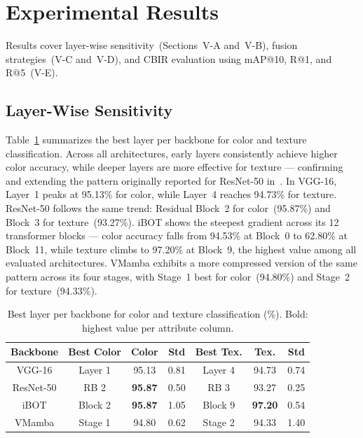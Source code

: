 \documentclass[conference]{IEEEtran}
\begin{document}
\section{Experimental Results}

Results cover layer-wise sensitivity~(Sections~V-A and~V-B), fusion
strategies~(V-C and~V-D), and CBIR evaluation using mAP@10, R@1, and
R@5~(V-E).

\subsection{Layer-Wise Sensitivity}

Table~\ref{tab_best_layer} summarizes the best layer per backbone for
color and texture classification.
Across all architectures, early layers consistently achieve higher color
accuracy, while deeper layers are more effective for texture — confirming
and extending the pattern originally reported for ResNet-50
in~\cite{b2}.
In VGG-16, Layer~1 peaks at 95.13\% for color, while Layer~4 reaches
94.73\% for texture.
ResNet-50 follows the same trend: Residual Block~2 for color~(95.87\%)
and Block~3 for texture~(93.27\%).
iBOT shows the steepest gradient across its 12 transformer blocks —
color accuracy falls from 94.53\% at Block~0 to 62.80\% at Block~11,
while texture climbs to 97.20\% at Block~9, the highest value among all
evaluated architectures.
VMamba exhibits a more compressed version of the same pattern across its
four stages, with Stage~1 best for color~(94.80\%) and Stage~2 for
texture~(94.33\%).

\begin{table}[htbp]
\caption{Best layer per backbone for color and texture classification
         (\%). Bold: highest value per attribute column.}
\begin{center}
\begin{tabular}{c|c|c|c|c|c|c}
\hline
\textbf{Backbone} & \textbf{Best Color} & \textbf{Color} & \textbf{Std}
                  & \textbf{Best Tex.}  & \textbf{Tex.}  & \textbf{Std} \\
\hline
VGG-16    & Layer 1 & 95.13          & 0.81 & Layer 4 & 94.73          & 0.74 \\
ResNet-50 & RB 2    & \textbf{95.87} & 0.50 & RB 3    & 93.27          & 0.25 \\
iBOT      & Block 2 & \textbf{95.87} & 1.05 & Block 9 & \textbf{97.20} & 0.54 \\
VMamba    & Stage 1 & 94.80          & 0.62 & Stage 2 & 94.33          & 1.40 \\
\hline
\end{tabular}
\label{tab_best_layer}
\end{center}
\end{table}
\end{document}
